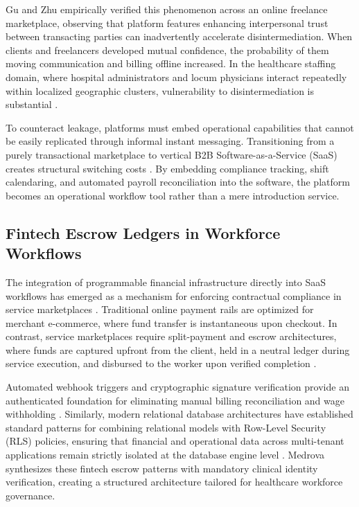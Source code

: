 \documentclass[conference]{IEEEtran}
\begin{document}
Gu and Zhu \cite{gu2021trust} empirically verified this phenomenon across an online freelance marketplace, observing that platform features enhancing interpersonal trust between transacting parties can inadvertently accelerate disintermediation. When clients and freelancers developed mutual confidence, the probability of them moving communication and billing offline increased. In the healthcare staffing domain, where hospital administrators and locum physicians interact repeatedly within localized geographic clusters, vulnerability to disintermediation is substantial \cite{currie2019locum}. 

To counteract leakage, platforms must embed operational capabilities that cannot be easily replicated through informal instant messaging. Transitioning from a purely transactional marketplace to vertical B2B Software-as-a-Service (SaaS) creates structural switching costs \cite{parker2016platform}. By embedding compliance tracking, shift calendaring, and automated payroll reconciliation into the software, the platform becomes an operational workflow tool rather than a mere introduction service.

\subsection{Fintech Escrow Ledgers in Workforce Workflows}
The integration of programmable financial infrastructure directly into SaaS workflows has emerged as a mechanism for enforcing contractual compliance in service marketplaces \cite{christidis2016blockchains}. Traditional online payment rails are optimized for merchant e-commerce, where fund transfer is instantaneous upon checkout. In contrast, service marketplaces require split-payment and escrow architectures, where funds are captured upfront from the client, held in a neutral ledger during service execution, and disbursed to the worker upon verified completion \cite{einav2016peer}.

Automated webhook triggers and cryptographic signature verification provide an authenticated foundation for eliminating manual billing reconciliation and wage withholding \cite{krawczyk1997hmac}. Similarly, modern relational database architectures have established standard patterns for combining relational models with Row-Level Security (RLS) policies, ensuring that financial and operational data across multi-tenant applications remain strictly isolated at the database engine level \cite{supabase2023rls}. Medrova synthesizes these fintech escrow patterns with mandatory clinical identity verification, creating a structured architecture tailored for healthcare workforce governance.
\end{document}
